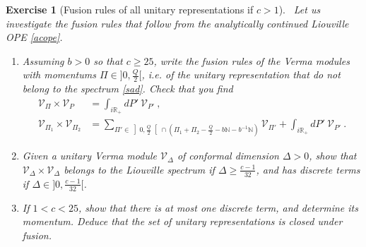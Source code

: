 \documentclass[12pt, a4paper, notitlepage, twoside]{report}
\numberwithin{equation}{section}
\theoremstyle{break}
\newtheorem{exo}{Exercise}[chapter]
\begin{document}
\begin{exo}[Fusion rules of all unitary representations if $c>1$]
 ~\label{exoaur}
 Let us investigate the fusion rules that follow from the analytically continued Liouville OPE \eqref{acope}.
 \begin{enumerate}
  \item Assuming $b>0$ so that $c\geq 25$, write the fusion rules of the Verma modules with momentums $\Pi\in ]0,\frac{Q}{2}[$, i.e. of the unitary representation that do not belong to the spectrum \eqref{sad}.  Check that you find
\begin{align}
 \mathcal{V}_\Pi \times \mathcal{V}_P  
&= \int_{i\mathbb{R}_+} dP'\ \mathcal{V}_{P'}\ ,
\\
 \mathcal{V}_{\Pi_1} \times \mathcal{V}_{\Pi_2} 
&= \sum_{\Pi'\in \left]0,\frac{Q}{2}\right[\cap \left(\Pi_1+\Pi_2 -\frac{Q}{2}- b\mathbb{N}-b^{-1}\mathbb{N}\right)} \mathcal{V}_{\Pi'}  
+ \int_{i\mathbb{R}_+} dP'\ \mathcal{V}_{P'}\ .
\end{align}
\item Given a unitary Verma module $\mathcal{V}_\Delta$ of conformal dimension $\Delta>0$, show that $\mathcal{V}_\Delta \times \mathcal{V}_\Delta$ belongs to the Liouville spectrum if $\Delta \geq \frac{c-1}{32}$, and has discrete terms if $\Delta \in ]0,\frac{c-1}{32}[$.
\item If $1<c<25$, show that there is at most one discrete term, and determine its momentum. Deduce that the set of unitary representations is closed under fusion.
 \end{enumerate}
\end{exo}
\end{document}
